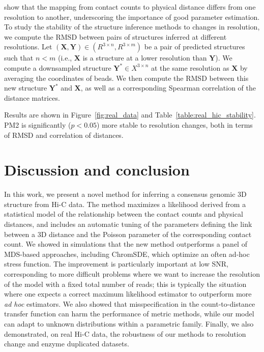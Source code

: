\citet{zhang:spatial} show that the mapping from contact counts to
physical distance differs from one resolution to another, underscoring
the importance of good parameter estimation. To study the stability of
the structure inference methods to changes in resolution, we compute
the RMSD between pairs of structures inferred at different
resolutions.  Let $(\textbf{X}, \textbf{Y}) \in (R^{3 \times n}, R^{3
  \times m})$ be a pair of predicted structures such that $n < m$
(i.e., $\textbf{X}$ is a structure at a lower resolution than
$\textbf{Y}$). We compute a downsampled structure $\textbf{Y}^* \in
X^{3 \times n}$ at the same resolution as $\textbf{X}$ by averaging
the coordinates of beads.  We then compute the RMSD between this new
structure $\textbf{Y}^*$ and $\textbf{X}$, as well as a corresponding
Spearman correlation of the distance matrices.

Results are shown in Figure~\ref{fig:real_data} and
Table~\ref{table:real_hic_stability}. PM2 is significantly ($p < 0.05$)
more stable to resolution changes, both in terms of RMSD and correlation of
distances.

\section{Discussion and conclusion}

In this work, we present a novel method for inferring a consensus genomic 3D
structure from Hi-C data. The method maximizes a likelihood derived from a
statistical model of the relationship between the contact counts and physical
distances, and includes an automatic tuning of the parameters defining the
link between a 3D distance and the Poisson parameter of the corresponding
contact count. We showed in simulations that the new method outperforms a
panel of MDS-based approaches, including ChromSDE, which optimize an often
ad-hoc stress function. The improvement is particularly important at low SNR,
corresponding to more difficult problems where we want to increase the
resolution of the model with a fixed total number of reads; this is typically
the situation where one expects a correct maximum likelihood estimator to
outperform more {\em ad hoc} estimators. We also showed that misspecification
in the count-to-distance transfer function can harm the performance of metric
methods, while our model can adapt to unknown distributions within a
parametric family. Finally, we also demonstrated, on real Hi-C data, the
robustness of our methods to resolution change and enzyme duplicated datasets.

